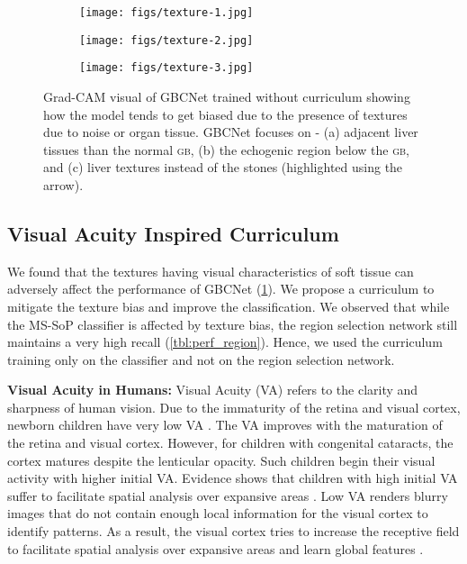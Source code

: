 \documentclass[10pt,twocolumn,letterpaper]{article}
\def\gb{\textsc{gb}\xspace}
\newcommand{\myfirstpara}[1]{\noindent \textbf{#1:}}
\newcommand{\mypara}[1]{\vspace{0.1em} \myfirstpara{#1}}
\begin{document}
\vspace{-1em}




 \begin{figure}[t]
    \centering
    \begin{subfigure}[b]{0.32\linewidth}
		\centering
		\texttt{[image: figs/texture-1.jpg]}
		\caption{}
\end{subfigure}
    \begin{subfigure}[b]{0.32\linewidth}
		\centering
		\texttt{[image: figs/texture-2.jpg]}
		\caption{}
\end{subfigure}
	\begin{subfigure}[b]{0.32\linewidth}
		\centering
		\texttt{[image: figs/texture-3.jpg]}
		\caption{}
\end{subfigure}
    \caption{Grad-CAM visual of GBCNet trained without curriculum showing how the model tends to get biased due to the presence of textures due to noise or organ tissue. GBCNet focuses on - (a) adjacent liver tissues than the normal \gb, (b) the echogenic region below the \gb, and (c) liver textures instead of the stones (highlighted using the arrow).}
    \label{fig:texture_bias_sample}
\end{figure}
\subsection{Visual Acuity Inspired Curriculum}
We found that the textures having visual characteristics of soft tissue can adversely affect the performance of GBCNet (\cref{fig:texture_bias_sample}). We propose a curriculum to mitigate the texture bias and improve the classification. We observed that while the MS-SoP classifier is affected by texture bias, the region selection network still maintains a very high recall (\cref{tbl:perf_region}). Hence, we used the curriculum training only on the classifier and not on the region selection network.

\mypara{Visual Acuity in Humans}
Visual Acuity (VA) refers to the clarity and sharpness of human vision. Due to the immaturity of the retina and visual cortex, newborn children have very low VA \cite{courage1990visual}. The VA improves with the maturation of the retina and visual cortex. However, for children with congenital cataracts, the cortex matures despite the lenticular opacity. Such children begin their visual activity with higher initial VA. Evidence shows that children with high initial VA suffer to facilitate spatial analysis over expansive areas \cite{vogelsang2018VisualAcuity}.  Low VA renders blurry images that do not contain enough local information for the visual cortex to identify patterns. As a result, the visual cortex tries to increase the receptive field to facilitate spatial analysis over expansive areas and learn global features \cite{kwon2016compensation, smith2009smile}. 
\end{document}

